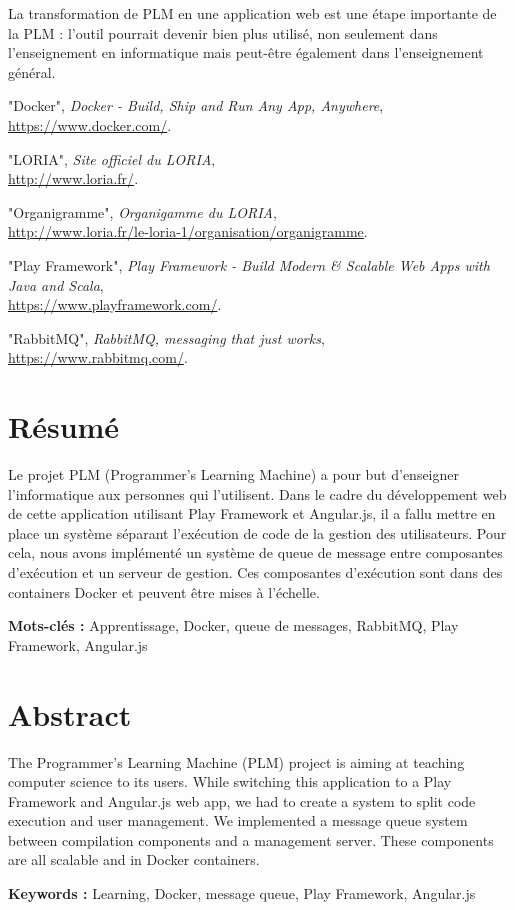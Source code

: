 \documentclass[stage]{tnreport}
\begin{document}
La transformation de PLM en une application web est une étape importante de la PLM : l'outil pourrait devenir bien plus utilisé, non seulement dans l'enseignement en informatique mais peut-être également dans l'enseignement général.

\cleardoublepage

\begin{thebibliography}{5}

	"Docker",
	\emph{Docker - Build, Ship and Run Any App, Anywhere}, \hfill \\
	\url{https://www.docker.com/}.

	"LORIA",
	\emph{Site officiel du LORIA}, \hfill \\
	\url{http://www.loria.fr/}.

	"Organigramme",
	\emph{Organigamme du LORIA}, \hfill \\
	\url{http://www.loria.fr/le-loria-1/organisation/organigramme}.

	"Play Framework",
	\emph{Play Framework - Build Modern \& Scalable Web Apps with Java and Scala}, \hfill \\
	\url{https://www.playframework.com/}.

	"RabbitMQ",
	\emph{RabbitMQ, messaging that just works}, \hfill \\
	\url{https://www.rabbitmq.com/}.

\end{thebibliography}

\cleardoublepage
\thispagestyle{empty}

\section*{Résumé}
Le projet PLM (Programmer's Learning Machine) a pour but d'enseigner l'informatique aux personnes qui l'utilisent. Dans le cadre du développement web de cette application utilisant Play Framework et Angular.js, il a fallu mettre en place un système séparant l'exécution de code de la gestion des utilisateurs. Pour cela, nous avons implémenté un système de queue de message entre composantes d'exécution et un serveur de gestion. Ces composantes d'exécution sont dans des containers Docker et peuvent être mises à l'échelle.

{\bf Mots-clés :} Apprentissage, Docker, queue de messages, RabbitMQ, Play Framework, Angular.js


\section*{Abstract}
The Programmer's Learning Machine (PLM) project is aiming at teaching computer science to its users. While switching this application to a Play Framework and Angular.js web app, we had to create a system to split code execution and user management. We implemented a message queue system between compilation components and a management server. These components are all scalable and in Docker containers.

{\bf Keywords :} Learning, Docker, message queue, Play Framework, Angular.js
\end{document}
